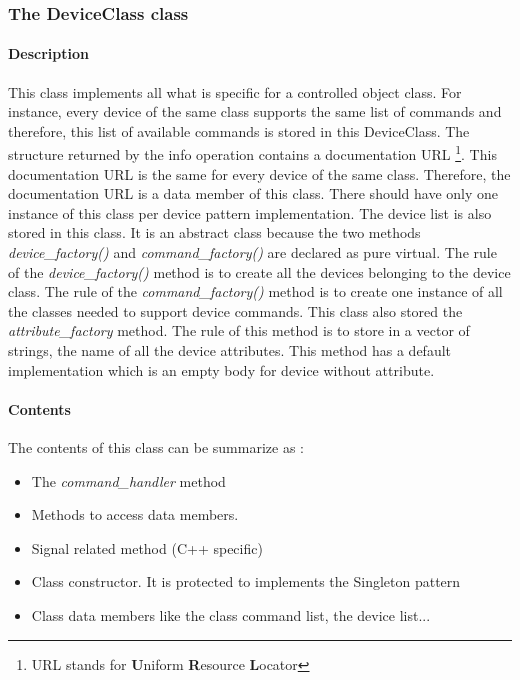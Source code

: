 \subsubsection{The DeviceClass class}


\paragraph{Description}

This class implements all what is specific for a controlled object
class. For instance, every device of the same class supports the same
list of commands and therefore, this list of available
commands is stored in this DeviceClass. The structure returned by
the info operation contains a documentation URL%
\footnote{URL stands for \textbf{U}niform \textbf{R}esource \textbf{L}ocator%
}. This documentation URL is the
same for every device of the same class. Therefore, the documentation
URL is a data member of this class. There should have only one instance
of this class per device pattern implementation. The device list is
also stored in this class. It is an abstract class because the two
methods \emph{device\_factory()} and \emph{command\_factory()}
are declared as pure virtual. The rule of the \emph{device\_factory()}
method is to create all the devices belonging to the device class.
The rule of the \emph{command\_factory()} method is to create one
instance of all the classes needed to support device commands. This
class also stored the \emph{attribute\_factory}
method. The rule of this method is to store in a vector of strings,
the name of all the device attributes. This method has a default implementation
which is an empty body for device without attribute.


\paragraph{Contents}

The contents of this class can be summarize as :
\begin{itemize}
\item The \emph{command\_handler} method
\item Methods to access data members.
\item Signal related method (C++ specific)
\item Class constructor. It is protected to implements the Singleton pattern
\item Class data members like the class command list, the device list...
\end{itemize}

